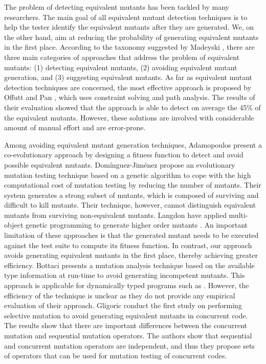 The problem of detecting equivalent mutants has been tackled by many researchers. The main goal of all equivalent mutant detection techniques is to help the tester identify the equivalent mutants after they are generated. We, on the other hand, aim at reducing the probability of generating equivalent mutants in the first place.
According to the taxonomy suggested by Madeyski \etal \cite{madeyski:tse13}, there are three main categories of approaches that address the problem of equivalent mutants: (1) detecting equivalent mutants, (2) avoiding equivalent mutant generation, and (3) suggesting equivalent mutants. As far as equivalent mutant detection techniques are concerned, 
the most effective approach is proposed by
Offutt and Pan \cite{offutt:tvr97, offutt:compass96}, which uses constraint
solving and path analysis. The results of their evaluation showed that the approach is able to detect on average the 45\% of the equivalent mutants. 
However, these solutions are involved with considerable amount of manual effort and are error-prone.

Among avoiding equivalent mutant generation techniques, Adamopoulos \etal \cite{adamopoulos:gecco04} present a co-evolutionary approach by designing a fitness function to detect and avoid possible equivalent mutants.
Dom\'inguez-Jim\'enez \etal \cite{dominguez:ist11} propose an evolutionary mutation testing
technique based on a genetic algorithm to cope with the high computational cost of mutation 
testing by reducing the number of mutants. Their system generates a strong subset
of mutants, which is composed of surviving and difficult to kill mutants. 
Their technique, however, cannot distinguish equivalent mutants from surviving non-equivalent mutants.
Langdon \etal have applied multi-object genetic programming to generate higher order mutants 
\cite{langdon:jss10}.
An important limitation of these approaches is that the generated
mutant needs to be executed against the test suite to compute its fitness function.
In contrast, our approach avoids  generating equivalent mutants in the first place,
thereby achieving greater efficiency.
Bottaci \cite{bottaci:icstw10} presents a mutation analysis technique based on the available type information at run-time to avoid generating incompetent mutants. 
This approach is applicable for dynamically typed programs such as \javascript. 
However, the efficiency of the technique is unclear as they do not provide any empirical evaluation of their approach.
Gligoric \etal \cite{gligoric:issta13} conduct the first study on performing selective mutation to avoid generating equivalent mutants in concurrent code. The results show that there are important differences between the concurrent mutation and sequential mutation operators. The authors show that sequential and concurrent mutation operators are independent, and thus they propose sets of operators that can be used for mutation testing of concurrent codes. 

